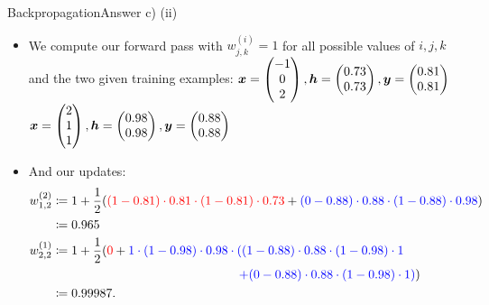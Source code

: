 \documentclass[t]{beamer}
\begin{document}
\begin{frame}{Backpropagation}{Answer c) (ii)}
    \begin{itemize}
        \item We compute our forward pass with $w^{(i)}_{j,k} = 1$ for all
              possible values of $i,j,k$ and the two given training
              examples:
              ${\boldsymbol{x}} = \begin{pmatrix}
                      -1 \\
                      0  \\
                      2
                  \end{pmatrix}, {\boldsymbol{h}} = \begin{pmatrix}
                      0.73 \\
                      0.73
                  \end{pmatrix}, {\boldsymbol{y}} = \begin{pmatrix}
                      0.81 \\
                      0.81
                  \end{pmatrix}$ 
              ${\boldsymbol{x}} = \begin{pmatrix}
                      2 \\
                      1 \\
                      1
                  \end{pmatrix}, {\boldsymbol{h}} = \begin{pmatrix}
                      0.98 \\
                      0.98
                  \end{pmatrix}, {\boldsymbol{y}} = \begin{pmatrix}
                      0.88 \\
                      0.88
                  \end{pmatrix}$ 
        \item And our updates:
              {\tiny
              \begin{align*}
                  w_{1,2}^{(2)} & \coloneqq 1+ \frac{1}{2} ({\color{red} (1-0.81)\cdot 0.81 \cdot (1-0.81) \cdot 0.73} + { \color{blue}(0-0.88) \cdot 0.88 \cdot (1-0.88) \cdot 0.98}) \\
                                & \coloneqq 0.965                                                                                                                                      \\
                  w_{2,2}^{(1)} & \coloneqq 1+ \frac{1}{2} ({\color{red}0} + {\color{blue}1\cdot (1-0.98)\cdot 0.98 \cdot ((1-0.88)\cdot 0.88 \cdot (1-0.98) \cdot 1}                  \\
                                & \qquad\qquad\qquad\qquad\qquad\qquad\qquad\quad{\color{blue}+(0-0.88)\cdot0.88\cdot (1-0.98)\cdot 1)})                                               \\
                                & \coloneqq 0.99987.
              \end{align*}
              }
    \end{itemize}
\end{frame}
\end{document}
